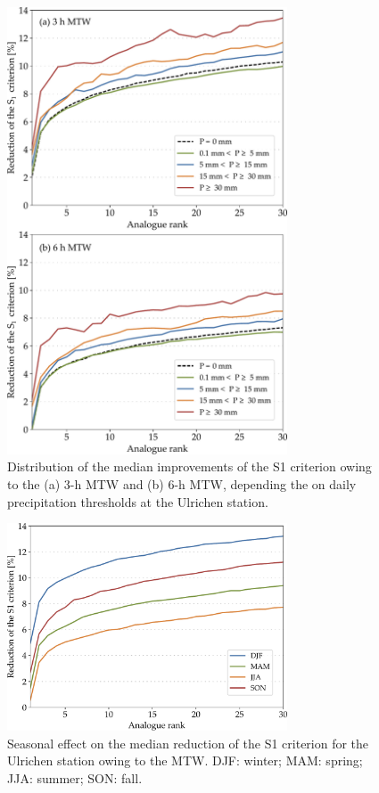 \documentclass[hess, manuscript]{copernicus}
\begin{document}
	\begin{figure}[htb]
		\begin{center}
			\includegraphics[width=8.3cm]{fig05.pdf}
		\end{center}
		\caption{Distribution of the median improvements of the S1 criterion owing to the (a) 3-h MTW and (b) 6-h MTW, depending the on daily precipitation thresholds at the Ulrichen station.}
		\label{fig:changes_S1_precip_threshold}
	\end{figure}

	\begin{figure}[htb]
		\begin{center}
			\includegraphics[width=8.3cm]{fig06.pdf}
		\end{center}
		\caption{Seasonal effect on the median reduction of the S1 criterion for the Ulrichen station owing to the MTW. DJF: winter; MAM: spring; JJA: summer; SON: fall.}
		\label{fig:changes_S1_seasons}
	\end{figure}
\end{document}
